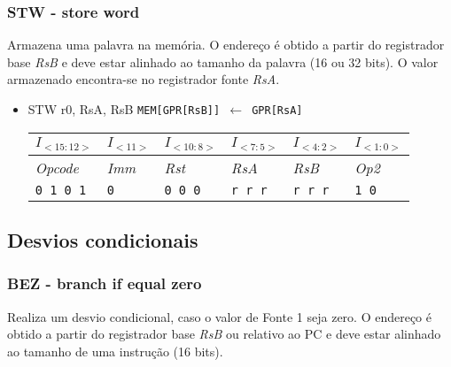 \documentclass{extreport}
\begin{document}
\subsubsection{STW - store word}
Armazena uma palavra na memória. O endereço é obtido a partir do registrador base \textit{RsB} e deve estar alinhado ao tamanho da palavra (16 ou 32 bits). O valor armazenado encontra-se no registrador fonte \textit{RsA}.

\begin{itemize}
\item STW r0, RsA, RsB
\subitem \texttt{MEM[GPR[RsB]] $\leftarrow$ GPR[RsA]}
\begin{table}[ht!]
\centering
\begin{tabular}{|p{1.6cm}|p{1.6cm}|p{1.6cm}|p{1.6cm}|p{1.6cm}|p{1.6cm}|}
\hline
$I_{<15:12>}$ & $I_{<11>}$ & $I_{<10:8>}$ & $I_{<7:5>}$ & $I_{<4:2>}$ & $I_{<1:0>}$ \\ \hline
\textit{Opcode} & \textit{Imm} & \textit{Rst} & \textit{RsA} & \textit{RsB} & \textit{Op2} \\ \hline
\texttt{0 1 0 1} & \texttt{0} & \texttt{0 0 0} & \texttt{r r r} & \texttt{r r r} & \texttt{1 0} \\ \hline
\end{tabular}
\end{table}
\end{itemize}

\subsection{Desvios condicionais}
\subsubsection{BEZ - branch if equal zero}
Realiza um desvio condicional, caso o valor de Fonte 1 seja zero. O endereço é obtido a partir do registrador base \textit{RsB} ou relativo ao PC e deve estar alinhado ao tamanho de uma instrução (16 bits).
\end{document}
